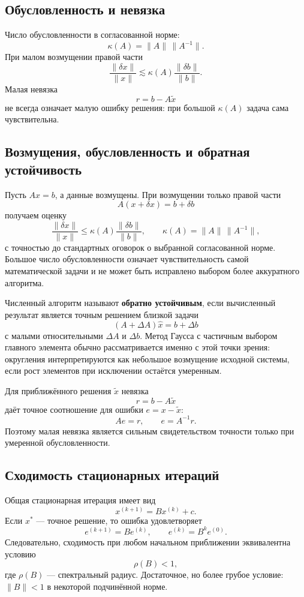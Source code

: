 \subsection{Обусловленность и невязка}

Число обусловленности в согласованной норме:
\[
    \kappa(A)=\|A\|\,\|A^{-1}\|.
\]
При малом возмущении правой части
\[
    \frac{\|\delta x\|}{\|x\|}
    \lesssim
    \kappa(A)\frac{\|\delta b\|}{\|b\|}.
\]
Малая невязка
\[
    r=b-A\widetilde x
\]
не всегда означает малую ошибку решения: при большой $\kappa(A)$ задача сама
чувствительна.

\subsection{Возмущения, обусловленность и обратная устойчивость}

Пусть $Ax=b$, а данные возмущены. При возмущении только правой части
\[
    A(x+\delta x)=b+\delta b
\]
получаем оценку
\[
    \frac{\|\delta x\|}{\|x\|}
    \le
    \kappa(A)\frac{\|\delta b\|}{\|b\|},
    \qquad
    \kappa(A)=\|A\|\,\|A^{-1}\|,
\]
с точностью до стандартных оговорок о выбранной согласованной норме. Большое число
обусловленности означает чувствительность самой математической задачи и не может быть
исправлено выбором более аккуратного алгоритма.

Численный алгоритм называют \textbf{обратно устойчивым}, если вычисленный результат
является точным решением близкой задачи
\[
    (A+\Delta A)\widehat x=b+\Delta b
\]
с малыми относительными $\Delta A$ и $\Delta b$. Метод Гаусса с частичным выбором
главного элемента обычно рассматривается именно с этой точки зрения: округления
интерпретируются как небольшое возмущение исходной системы, если рост элементов при
исключении остаётся умеренным.

Для приближённого решения $\widetilde x$ невязка
\[
    r=b-A\widetilde x
\]
даёт точное соотношение для ошибки $e=x-\widetilde x$:
\[
    Ae=r,\qquad e=A^{-1}r.
\]
Поэтому малая невязка является сильным свидетельством точности только при умеренной
обусловленности.

\subsection{Сходимость стационарных итераций}

Общая стационарная итерация имеет вид
\[
    x^{(k+1)}=Bx^{(k)}+c.
\]
Если $x^*$ --- точное решение, то ошибка удовлетворяет
\[
    e^{(k+1)}=Be^{(k)},\qquad e^{(k)}=B^ke^{(0)}.
\]
Следовательно, сходимость при любом начальном приближении эквивалентна условию
\[
    \rho(B)<1,
\]
где $\rho(B)$ --- спектральный радиус. Достаточное, но более грубое условие:
$\|B\|<1$ в некоторой подчинённой норме.

